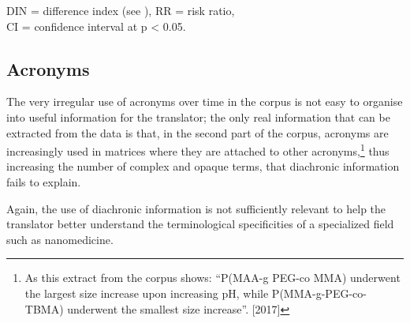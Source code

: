 \documentclass[output=paper]{langscibook}
\begin{document}
\begin{table}
\caption{Changes in spelling variation of the term ‘nanovesicle’ over three~time periods of the corpus.}
{DIN = difference index (see \citealt{FidlerCvrček2015}), RR = risk ratio,\\
CI = confidence interval at p < 0.05.}
\label{tab:key:9}
\end{table}

\subsection{Acronyms}\label{sec:cuchet:4.3}

The very irregular use of acronyms over time in the corpus is not easy to organise into useful information for the translator; the only real information that can be extracted from the data is that, in the second part of the corpus, acronyms are increasingly used in matrices where they are attached to other acronyms,\footnote{As this extract from the corpus shows: “P(MAA-g PEG-co MMA) underwent the largest size increase upon increasing pH, while P(MMA-g-PEG-co-TBMA) underwent the smallest size increase”. [2017]} thus increasing the number of complex and opaque terms, that diachronic information fails to explain.

Again, the use of diachronic information is not sufficiently relevant to help the translator better understand the terminological specificities of a specialized field such as nanomedicine.
\end{document}
